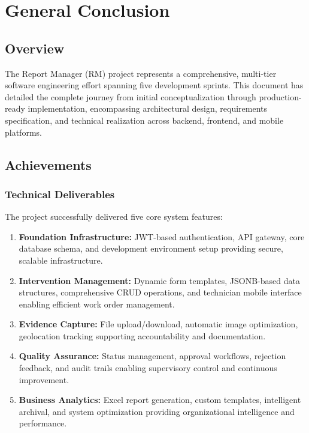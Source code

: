 
\chapter*{General Conclusion}

\section*{Overview}

The Report Manager (RM) project represents a comprehensive, multi-tier software engineering effort spanning five development sprints. This document has detailed the complete journey from initial conceptualization through production-ready implementation, encompassing architectural design, requirements specification, and technical realization across backend, frontend, and mobile platforms.

\section*{Achievements}

\subsection*{Technical Deliverables}

The project successfully delivered five core system features:

\begin{enumerate}
\item \textbf{Foundation Infrastructure:} JWT-based authentication, API gateway, core database schema, and development environment setup providing secure, scalable infrastructure.

\item \textbf{Intervention Management:} Dynamic form templates, JSONB-based data structures, comprehensive CRUD operations, and technician mobile interface enabling efficient work order management.

\item \textbf{Evidence Capture:} File upload/download, automatic image optimization, geolocation tracking supporting accountability and documentation.

\item \textbf{Quality Assurance:} Status management, approval workflows, rejection feedback, and audit trails enabling supervisory control and continuous improvement.

\item \textbf{Business Analytics:} Excel report generation, custom templates, intelligent archival, and system optimization providing organizational intelligence and performance.
\end{enumerate}

